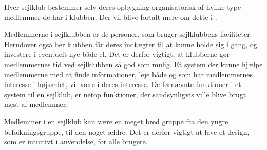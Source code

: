Hver sejlklub bestemmer selv deres opbygning organisatorisk af hvilke type medlemmer de har i klubben.
 Der vil blive fortalt mere om dette i . 

Medlemmerne i sejlklubben er de personer, som bruger sejlklubbens faciliteter.  Herudover også her klubben får deres indtægter til at kunne holde sig i gang, og investere i
eventuelt nye både el. 
Det er derfor vigtigt, at klubberne gør medlemmernes tid ved sejlklubben så god som mulig. Et system der kunne
hjælpe medlemmerne med at finde informationer, leje både og som har medlemmernes interesse i højsædet, vil
være i deres interesse. De førnævnte funktioner i et system til en sejlklub, er netop funktioner, der
sandsynligvis ville blive brugt mest af medlemmer.

Medlemmer i en sejlklub kan være en meget bred gruppe fra den yngre befolkningsgruppe, til den noget ældre.
Det er derfor vigtigt at lave et design, som er intuitivt i anvendelse, for alle brugere.





